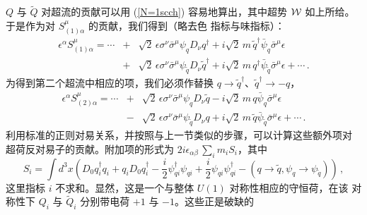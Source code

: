 $Q$ 与 $\widetilde Q$ 对超流的贡献可以用 (\ref{N=1scch}) 容易地算出，其中超势
${\cal W}$ 如上所给。于是作为对 $S^\mu_{(1)\alpha}$ 的贡献，我们得到（略去色
指标与味指标）：
\begin{eqnarray}
\epsilon^\alpha S^\mu_{(1)\alpha}=\cdots&+&\sqrt{2}\,\epsilon\sigma^\nu  
\bar{\sigma}^\mu\psi_q D_\nu q^\dagger+i\sqrt{2}\,m\,
\widetilde{q}^\dagger \bar{\psi}_q\bar{\sigma}^\mu \epsilon\nonumber\\
&+& \sqrt{2}\,\epsilon\sigma^\nu\bar{\sigma}^\mu\psi_{\widetilde{q}}
D_\nu {\widetilde{q}^\dagger} + i \sqrt{2}\, m\, q^\dagger
\bar{\psi}_{\widetilde{q}} \bar{\sigma}^\mu \epsilon +\cdots\,.\nonumber
\end{eqnarray}
为得到第二个超流中相应的项，我们必须作替换
$q\rightarrow\widetilde q^\dagger$、$\widetilde q^\dagger\rightarrow -q$，
\begin{eqnarray}
\epsilon^\alpha S^\mu_{(2)\alpha}=\cdots&+&\sqrt{2}\,\epsilon\sigma^\nu  
\bar{\sigma}^\mu\psi_q D_\nu \widetilde q - i\sqrt{2}\,m\,
q \bar{\psi}_q\bar{\sigma}^\mu \epsilon\nonumber\\
&-& \sqrt{2}\,\epsilon\sigma^\nu\bar{\sigma}^\mu\psi_{\widetilde{q}}
D_\nu q + i \sqrt{2}\, m\, \widetilde q \bar{\psi}_{\widetilde{q}} 
\bar{\sigma}^\mu \epsilon +\cdots\nonumber\,.
\end{eqnarray}
利用标准的正则对易关系，并按照与上一节类似的步骤，可以计算这些额外项对
超荷反对易子的贡献。附加项的形式为
$2i\epsilon_{\alpha\beta}\,\sum_im_i S_i$，其中
$$
S_i=\int d^3x\left(D_0q_i^\dagger q_i + q_iD_0q_i^\dagger
-\frac{i}{2}\psi^\dagger_{qi}\psi_{qi} + \frac{i}{2}\psi_{qi}
\psi^\dagger_{qi} -(q\rightarrow \widetilde q, \psi_q\rightarrow
\psi_{\widetilde q})\right)\,,
$$   
这里指标 $i$ 不求和。显然，这是一个与整体 $U(1)$ 对称性相应的守恒荷，在该
对称性下 $Q_i$ 与 $\widetilde Q_i$ 分别带电荷 $+1$ 与 $-1$。这些正是破缺的
